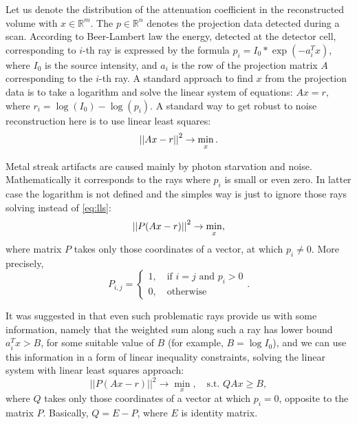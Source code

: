 \label{s-approach}
Let us denote the distribution of the attenuation coefficient in the reconstructed volume with $x \in \mathbb{R}^m$. The $p \in \mathbb{R}^n$ denotes the projection data detected during a scan. According to Beer-Lambert law the energy, detected at the detector cell, corresponding to $i$-th ray is expressed by the formula $p_i = I_0 * \exp(-a_i^T x)$, where $I_0$ is the source intensity, and $a_i$ is the row of the projection matrix $A$ corresponding to the $i$-th ray. A standard approach to find $x$ from the projection data is to take a logarithm and solve the linear system of equations: $Ax = r$, where
$r_i = \log(I_0) - \log(p_i)$. A standard way to get robust to noise reconstruction here is to use linear least squares:
\begin{equation} \label{eq:lls}
  \left|\left| Ax - r \right|\right|^2 \to \min\limits_{x}.
\end{equation}

Metal streak artifacts are caused mainly by photon starvation and noise. Mathematically it corresponds to the rays where $p_i$ is small or even zero. In latter case the logarithm is not defined and the simples way is just to ignore those rays solving instead of \eqref{eq:lls}:
\begin{equation}
  \label{eq:mask-lls}
  \left|\left| P(Ax - r) \right|\right|^2 \to \min\limits_{x},
\end{equation}
where matrix $P$ takes only those coordinates of a vector, at which $p_i \neq 0$. More precisely,
$$
P_{i,j} = \begin{cases}
  1, \quad\text{if $i = j$ and $p_i > 0$} \\
  0, \quad\text{otherwise}
  \end{cases}.
$$

It was suggested in \cite{chukalinaway} that even such problematic rays provide us with some information, namely that the weighted sum along such a ray has lower bound $a_i^T x > B$, for some suitable value of $B$ (for example, $B = \log I_0$), and we can use this information in a form of linear inequality constraints, solving the linear system with linear least squares approach:
\begin{equation}
  ||P(Ax - r)||^2 \to \min\limits_x, \quad\textrm{s.t. }  QAx \ge B,
\end{equation}
where $Q$ takes only those coordinates of a vector at which $p_i = 0$, opposite to the matrix $P$. Basically, $Q = E - P$, where $E$ is identity matrix.

